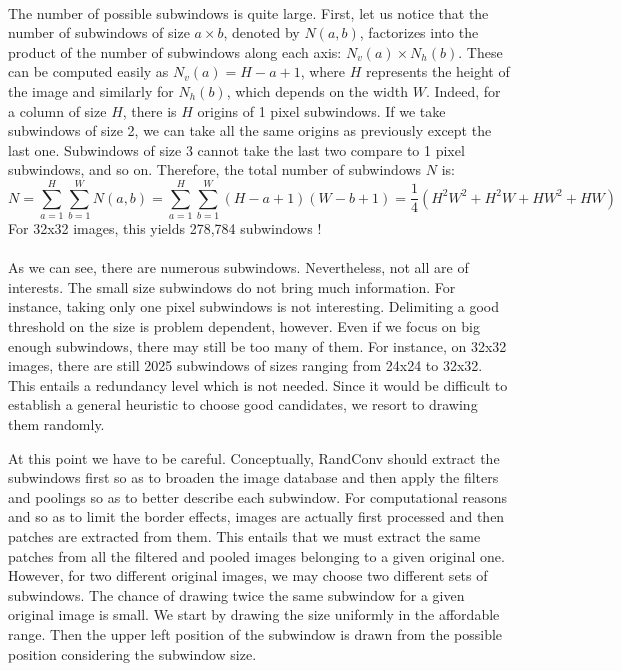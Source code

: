 \documentclass[a4paper]{report}
\newlength{\larg}
\begin{document}
		\paragraph{}
		The number of possible subwindows is quite large. %
		First, let us notice that the number of subwindows of size $a \times b$, denoted by $N(a,b)$, factorizes into the product of the number of subwindows along each axis: $N_v(a) \times N_h(b)$. These can be computed easily as $N_v(a) = H - a + 1$, where $H$ represents the height of the image and similarly for $N_h(b)$, which depends on the width $W$. Indeed, for a column of size $H$, there is $H$ origins of 1 pixel subwindows. If we take subwindows of size 2, we can take all the same origins as previously except the last one. Subwindows of size 3 cannot take the last two compare to 1 pixel subwindows, and so on.
		Therefore, the total number of subwindows $N$ is:
		\[
			N = \sum_{a=1}^H \sum_{b=1}^W N(a,b) = \sum_{a=1}^H \sum_{b=1}^W (H-a+1)(W-b+1) = \frac{1}{4}(H^2W^2 + H^2 W + H W^2 + HW)
		\]
		For 32x32 images, this yields 278,784 subwindows !
		
		\paragraph{}
		As we can see, there are numerous subwindows. Nevertheless, not all are of interests. The small size subwindows do not bring much information. For instance, taking only one pixel subwindows is not interesting. Delimiting a good threshold on the size is problem dependent, however. Even if we focus on big enough subwindows, there may still be too many of them. For instance, on 32x32 images, there are still 2025 subwindows of sizes ranging from 24x24 to 32x32. This entails a redundancy level which is not needed.
		Since it would be difficult to establish a general heuristic to choose good candidates, we resort to drawing them randomly. 
		\par
		At this point we have to be careful. Conceptually, RandConv should extract the subwindows first so as to broaden the image database and then apply the filters and poolings so as to better describe each subwindow. For computational reasons and so as to limit the border effects, images are actually first processed and then patches are extracted from them. This entails that we must extract the same patches from all the filtered and pooled images belonging to a given original one.
		However, for two different original images, we may choose two different sets of subwindows.
		The chance of drawing twice the same subwindow for a given original image is small.
		We start by drawing the size uniformly in the affordable range. Then the upper left position of the subwindow is drawn from the possible position considering the subwindow size.
		
\end{document}
